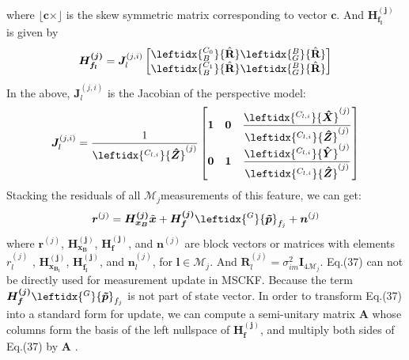\documentclass[a4paper, 10pt, conference]{ieeeconf}      %
\begin{document}
where $ \lfloor \bm c\times \rfloor  $ is the skew symmetric matrix corresponding to vector $ \bm  c $. And $ \bm{H_{f_{l}}^{(j)}} $ is given by 
\begin{equation}
\bm{H_{f_{l}}^{(j)}} =  \bm J_l^{(j,i)} \left[\begin{matrix} \leftidx{_B^{C_0}}{\hat {\textbf R}} \leftidx{_G^B}{\hat {\textbf R}} \\  \leftidx{_B^{C_1}}{\hat {\textbf R}} \leftidx{_G^B}{\hat {\textbf R}} \end{matrix}  \right]  
\end{equation}
In the above, $ \bm J_l^{(j,i)} $ is the Jacobian of the perspective model:
\begin{equation}
\bm J_l^{(j,i)}=  \frac{1}{\leftidx{^{C_{l,i}}}{\bm {\hat Z}}^{(j)}}\left[ \begin{matrix} \bm 1 & \bm 0 &\dfrac{\leftidx{^{C_{l,i}}}{\bm {\hat X}}^{(j)}}{\leftidx{^{C_{l,i}}}{\bm {\hat Z}}^{(j)}} \\ \bm 0 & \bm 1 & \dfrac{\leftidx{^{C_{l,i}}}{\bm {\hat Y}}^{(j)}}{\leftidx{^{C_{l,i}}}{\bm {\hat Z}}^{(j)}} \end{matrix} \right]
\end{equation}
Stacking the residuals
of all $  \mathcal M_j  $measurements of this feature, we can get:
\begin{equation}
\bm {r}^{(j)} =\bm{H_{x_{B}}^{(j)}}{\tilde {\bm x}}+\bm{H_{f}^{(j)}}{\leftidx{^{G}}{\bm {\tilde p}}_{f_{j}}}+{\bm n^{(j)}}
\end{equation}
where $ \bm {r}^{(j)} $, $ \bm{H_{x_{B}}^{(j)}} $, $ \bm{H_{f}^{(j)}} $, and $ {\bm n^{(j)}} $ are block vectors or matrices with elements $ {r}_l^{(j)} $ , $ \bm{H_{x_{B_l}}^{(j)}} $, $ \bm{H_{f_{l}}^{(j)}} $, and $ {\bm n_l^{(j)}} $, for  $ \bm l \in \mathcal M_j $. And   $  \bm R_l^{(j)} = {\sigma}_{im}^2 \bm I_{4\mathcal M_j} $.
Eq.(37)  can not be directly used for measurement update in MSCKF. Because the term $ \bm{H_{f}^{(j)}}{\leftidx{^{G}}{\bm {\tilde p}}_{f_{j}}} $ is not part of state vector. In order to transform Eq.(37) into a standard form for update, we can compute a semi-unitary matrix $ \bm A $ whose columns form
the basis of the left nullspace of $ \bm{H_{f}^{(j)}} $, and multiply both sides of Eq.(37) by $ \bm A $ .
\end{document}
